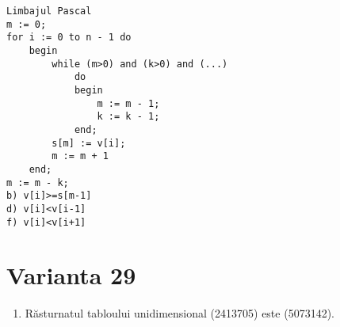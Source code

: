 \begin{verbatim}
Limbajul Pascal
m := 0;
for i := 0 to n - 1 do
    begin
        while (m>0) and (k>0) and (...)
            do
            begin
                m := m - 1;
                k := k - 1;
            end;
        s[m] := v[i];
        m := m + 1
    end;
m := m - k;
b) v[i]>=s[m-1]
d) v[i]<v[i-1]
f) v[i]<v[i+1]
\end{verbatim}

\section*{Varianta 29}
\begin{enumerate}
  \item Răsturnatul tabloului unidimensional (2413705) este (5073142).
\end{enumerate}

